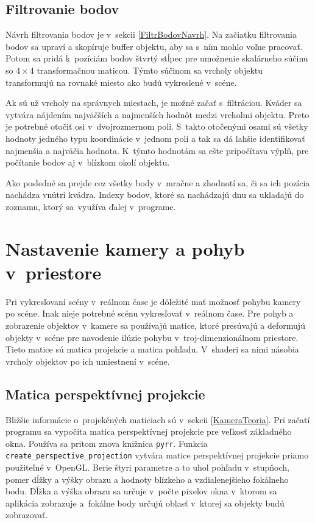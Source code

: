 \subsection*{Filtrovanie bodov}
\label{PointFiltering}
Návrh filtrovania bodov je v~sekcii \ref{FiltrBodovNavrh}. Na začiatku filtrovania bodov sa upraví a skopíruje buffer objektu, aby sa s~ním mohlo voľne pracovať. Potom sa pridá k~pozíciám bodov štvrtý stĺpec pre umožnenie skalárneho súčinu so $4 \times 4$ transformačnou maticou. Týmto súčinom sa vrcholy objektu transformujú na rovnaké miesto ako budú vykreslené v~scéne.

Ak sú už vrcholy na správnych miestach, je možné začať s~filtráciou. Kváder sa vytvára nájdením najväčších a najmenších hodnôt medzi vrcholmi objektu. Preto je potrebné otočiť osi v~dvojrozmernom poli. S~takto otočenými osami sú všetky hodnoty jedného typu koordinácie v~jednom poli a tak sa dá lahšie identifikovať najmenšia a najväčia hodnota. K~týmto hodnotám sa ešte pripočítava výplň, pre počítanie bodov aj v~blízkom okolí objektu.

Ako posledné sa prejde cez všetky body v~mračne a zhodnotí sa, či sa ich pozícia nachádza vnútri kvádra. Indexy bodov, ktoré sa nachádzajú dnu sa ukladajú do zoznamu, ktorý sa~využíva ďalej v~programe.

\section{Nastavenie kamery a pohyb v~priestore}
Pri vykresľovaní scény v~reálnom čase je dôležité mať možnosť pohybu kamery po scéne. Inak nieje potrebné scénu vykresľovať v~reálnom čase. Pre pohyb a zobrazenie objektov v~kamere sa používajú matice, ktoré presúvajú a deformujú objekty v~scéne pre navodenie ilúzie pohybu v~troj-dimenzionálnom priestore. Tieto matice sú matica projekcie a matica pohľadu. V~shaderi sa nimi násobia vrcholy objektov po ich umiestnení v~scéne.

\subsection*{Matica perspektívnej projekcie}
Bližšie informácie o~projekčných maticiach sú v~sekcii \ref{KameraTeoria}. Pri začatí programu sa vypočíta matica perspektívnej projekcie pre veľkosť základného okna. Používa sa pritom znova knižnica \verb|pyrr|. Funkcia \verb|create_perspective_projection| vytvára matice perspektívnej projekcie priamo použiteľné v~OpenGL. Berie štyri parametre a to uhol pohľadu v~stupňoch, pomer dĺžky a výšky obrazu a hodnoty blízkeho a vzdialenejšieho fokálneho bodu. Dĺžka a výška obrazu sa určuje v~počte pixelov okna v~ktorom sa aplikácia zobrazuje a~fokálne body určujú oblasť v~ktorej sa objekty budú zobrazovať.

